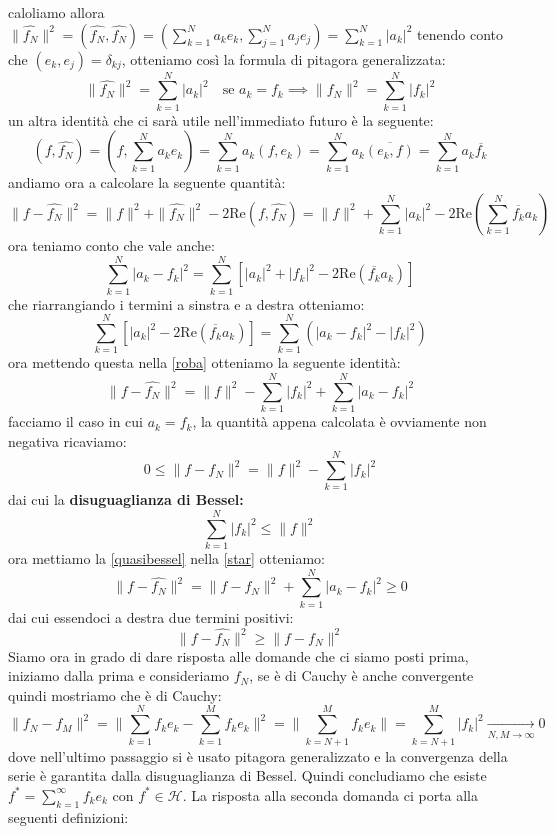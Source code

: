 \documentclass[12pt]{book}
\theoremstyle{plain}
\renewcommand{\H}{\mathcal{H}}
\theoremstyle{definition}
\theoremstyle{remark}
\begin{document}
caloliamo allora $\|\hat{f_N}\|^2 = (\hat{f_N},\hat{f_N}) = (\displaystyle \sum_{k=1}^Na_k e_k,\displaystyle \sum_{j=1}^Na_je_j) = \sum_{k=1}^N |a_k|^2$
tenendo conto che $(e_k,e_j) = \delta_{kj}$, otteniamo così la formula di pitagora generalizzata:
\[\|\hat{f_N}\|^2 =\sum_{k=1}^N |a_k|^2\quad \text{se } a_k=f_k \implies \|f_N\|^2 =\sum_{k=1}^N |f_k|^2\]
un altra identità che ci sarà utile nell'immediato futuro è la seguente:
\[(f,\hat{f_N}) = (f,\sum_{k=1}^Na_k e_k) = \sum_{k=1}^Na_k(f,e_k) = \sum_{k=1}^Na_k\overline{(e_k,f)} = \sum_{k=1}^Na_k\overline{f_k}\]
andiamo ora a calcolare la seguente quantità:
\begin{equation}\label{roba}\|f-\hat{f_N}\|^2 = \|f\|^2 + \|\hat{f_N}\|^2 - 2\text{Re}(f,\hat{f_N}) = \|f\|^2+\sum_{k=1}^N |a_k|^2 - 2\text{Re}\left(\sum_{k=1}^N\overline{f_k}a_k\right)\end{equation}
ora teniamo conto che vale anche:
\[\sum_{k=1}^N |a_k-f_k|^2 = \sum_{k=1}^N\left[|a_k|^2+|f_k|^2-2\text{Re}(\overline{f_k}a_k)\right]\]
che riarrangiando i termini a sinstra e a destra otteniamo:
\[\sum_{k=1}^N\left[|a_k|^2-2\text{Re}(\overline{f_k}a_k)\right] = \sum_{k=1}^N (|a_k-f_k|^2 -|f_k|^2) \]
ora mettendo questa nella \eqref{roba} otteniamo la seguente identità:
\begin{equation}\label{star}\|f-\hat{f_N}\|^2 =\|f\|^2 -\sum_{k=1}^N|f_k|^2+\sum_{k=1}^N |a_k-f_k|^2\end{equation}
facciamo il caso in cui $a_k = f_k$, la quantità appena calcolata è ovviamente non negativa ricaviamo:
\begin{equation}\label{quasibessel}0\leq\|f-f_N\|^2  = \|f\|^2- \sum_{k=1}^N|f_k|^2 \end{equation}
dai cui la \textbf{disuguaglianza di Bessel:}
\[\sum_{k=1}^N|f_k|^2\leq \|f\|^2\]
ora mettiamo la \eqref{quasibessel} nella \eqref{star} otteniamo:
\[\|f-\hat{f_N}\|^2 = \|f-f_N\|^2 +  \sum_{k=1}^N |a_k-f_k|^2 \geq 0 \]
dai cui essendoci a destra due termini positivi:
\[\|f-\hat{f_N}\|^2 \geq \|f-f_N\|^2\]
Siamo ora in grado di dare risposta alle domande che ci siamo posti prima, iniziamo dalla prima e consideriamo $f_N$, se è di Cauchy è anche convergente quindi mostriamo che è di Cauchy:
\[\|f_N-f_M\|^2 = \| \sum_{k=1}^Nf_ke_k- \sum_{k=1}^Mf_ke_k \|^2 = \| \sum_{k=N+1}^Mf_ke_k\| = \sum_{k=N+1}^M|f_k|^2 \xrightarrow[N,M\to \infty]{}0 \]
dove nell'ultimo passaggio si è usato pitagora generalizzato e la convergenza della serie è garantita dalla disuguaglianza di Bessel. Quindi concludiamo che esiste $f^* =\displaystyle \sum_{k=1}^\infty f_ke_k $ con $f^*\in\H$. La risposta alla seconda domanda ci porta alla seguenti definizioni:
\end{document}
